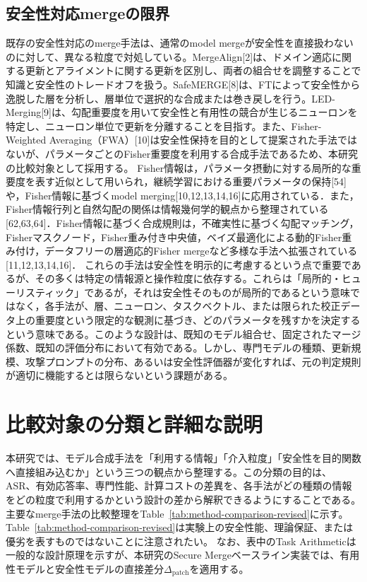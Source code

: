 \documentclass{article}
\begin{document}
\subsection{安全性対応mergeの限界}
既存の安全性対応のmerge手法は、通常のmodel mergeが安全性を直接扱わないのに対して、異なる粒度で対処している。MergeAlign[2]は、ドメイン適応に関する更新とアライメントに関する更新を区別し、両者の組合せを調整することで知識と安全性のトレードオフを扱う。SafeMERGE[8]は、FTによって安全性から逸脱した層を分析し、層単位で選択的な合成または巻き戻しを行う。LED-Merging[9]は、勾配重要度を用いて安全性と有用性の競合が生じるニューロンを特定し、ニューロン単位で更新を分離することを目指す。また、Fisher-Weighted Averaging（FWA）[10]は安全性保持を目的として提案された手法ではないが、パラメータごとのFisher重要度を利用する合成手法であるため、本研究の比較対象として採用する。
\color{red}
Fisher情報は，パラメータ摂動に対する局所的な重要度を表す近似として用いられ，継続学習における重要パラメータの保持[54]や，Fisher情報に基づくmodel merging[10,12,13,14,16]に応用されている．また，Fisher情報行列と自然勾配の関係は情報幾何学的観点から整理されている
[62,63,64]．Fisher情報に基づく合成規則は，不確実性に基づく勾配マッチング，Fisherマスクノード，Fisher重み付き中央値，ベイズ最適化による動的Fisher重み付け，データフリーの層適応的Fisher mergeなど多様な手法へ拡張されている[11,12,13,14,16]．
\color{black}
これらの手法は安全性を明示的に考慮するという点で重要であるが、その多くは特定の情報源と操作粒度に依存する。これらは「局所的・ヒューリスティック」であるが，それは安全性そのものが局所的であるという意味ではなく，各手法が、層、ニューロン、タスクベクトル、または限られた校正データ上の重要度という限定的な観測に基づき、どのパラメータを残すかを決定するという意味である。このような設計は、既知のモデル組合せ、固定されたマージ係数、既知の評価分布において有効である。しかし、専門モデルの種類、更新規模、攻撃プロンプトの分布、あるいは安全性評価器が変化すれば、元の判定規則が適切に機能するとは限らないという課題がある。


\section{比較対象の分類と詳細な説明}
\label{app:method-taxonomy-and-details}

本研究では、モデル合成手法を「利用する情報」「介入粒度」「安全性を目的関数へ直接組み込むか」という三つの観点から整理する。この分類の目的は、ASR、有効応答率、専門性能、計算コストの差異を、各手法がどの種類の情報をどの粒度で利用するかという設計の差から解釈できるようにすることである。主要なmerge手法の比較整理をTable~\ref{tab:method-comparison-revised}に示す。Table~\ref{tab:method-comparison-revised}は実験上の安全性能、理論保証、または優劣を表すものではないことに注意されたい。
なお、表中のTask Arithmeticは一般的な設計原理を示すが、本研究のSecure Mergeベースライン実装では、有用性モデルと安全性モデルの直接差分\(\Delta_{\mathrm{patch}}\)を適用する。
\end{document}
